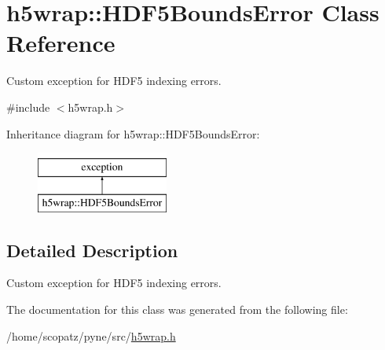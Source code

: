\hypertarget{classh5wrap_1_1_h_d_f5_bounds_error}{\section{h5wrap\-:\-:H\-D\-F5\-Bounds\-Error Class Reference}
\label{classh5wrap_1_1_h_d_f5_bounds_error}
}


Custom exception for H\-D\-F5 indexing errors.  




{\ttfamily \#include $<$h5wrap.\-h$>$}

Inheritance diagram for h5wrap\-:\-:H\-D\-F5\-Bounds\-Error\-:\begin{figure}[H]
\begin{center}
\leavevmode
\includegraphics[height=2.000000cm]{classh5wrap_1_1_h_d_f5_bounds_error}
\end{center}
\end{figure}


\subsection{Detailed Description}
Custom exception for H\-D\-F5 indexing errors. 

The documentation for this class was generated from the following file\-:\begin{DoxyCompactItemize}
\item 
/home/scopatz/pyne/src/\hyperlink{h5wrap_8h}{h5wrap.\-h}\end{DoxyCompactItemize}
